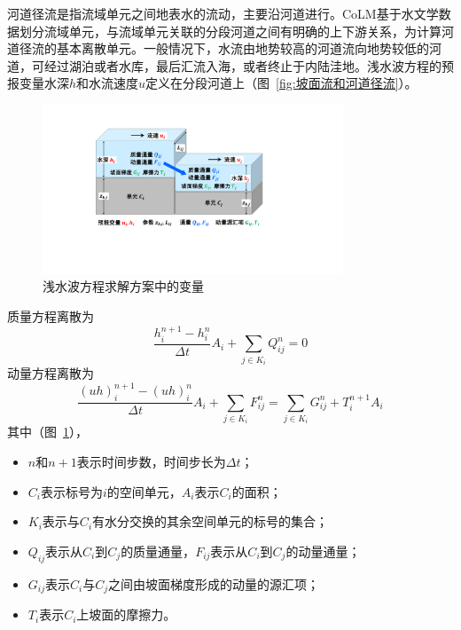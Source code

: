 河道径流是指流域单元之间地表水的流动，主要沿河道进行。CoLM基于水文学数据划分流域单元，与流域单元关联的分段河道之间有明确的上下游关系，为计算河道径流的基本离散单元。一般情况下，水流由地势较高的河道流向地势较低的河道，可经过湖泊或者水库，最后汇流入海，或者终止于内陆洼地。浅水波方程的预报变量水深$h$和水流速度$u$定义在分段河道上（图~\ref{fig:坡面流和河道径流}）。

{
  \begin{figure}[htbp]
    \centering
    \includegraphics[width=0.8\textwidth]{Figures/侧向流/浅水波方程求解.pdf}
    \caption{浅水波方程求解方案中的变量}
    \label{fig:浅水波方程求解}
  \end{figure}
}

质量方程离散为
\begin{equation} \label{formula:mass_swe}
  \frac{ h^{n+1}_i - h^n_i}{\Delta t} A_i+\sum_{j\in K_i} Q^n_{ij} = 0
\end{equation}
动量方程离散为
\begin{equation}
  \frac{ \left(uh\right)^{n+1}_i - \left(uh\right)^n_i}{\Delta t} A_i + \sum_{j\in K_i} F^n_{ij} = \sum_{j\in K_i} G^n_{ij}  + T^{n+1}_i  A_i \label{swe-d-2}
\end{equation}
其中（图~\ref{fig:浅水波方程求解}），
\begin{itemize}
  \item $n$和$n+1$表示时间步数，时间步长为$\Delta t$；
  \item $C_i$表示标号为$i$的空间单元，$A_i$表示$C_i$的面积；
  \item $K_i$表示与$C_i$有水分交换的其余空间单元的标号的集合；
  \item $Q_{ij}$表示从$C_i$到$C_j$的质量通量，$F_{ij}$表示从$C_i$到$C_j$的动量通量；
  \item $G_{ij}$表示$C_i$与$C_j$之间由坡面梯度形成的动量的源汇项；
  \item $T_i$表示$C_i$上坡面的摩擦力。
\end{itemize}

